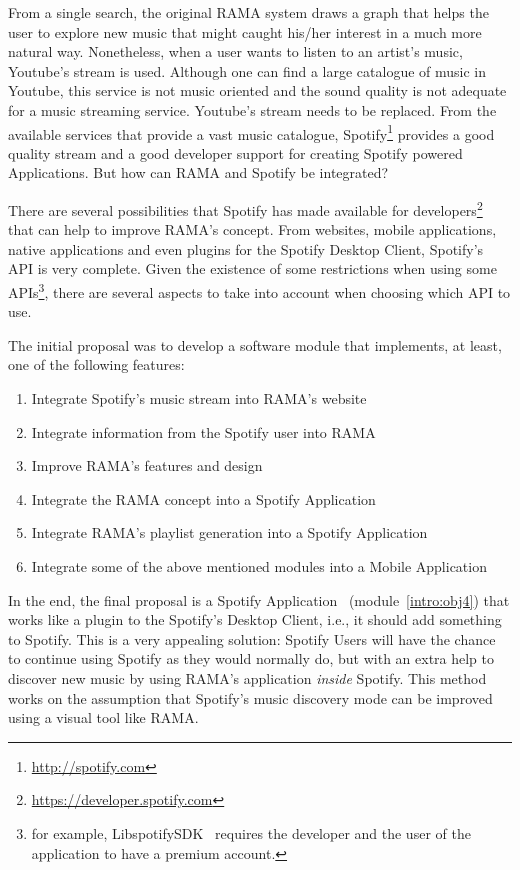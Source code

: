 \documentclass[twocolumn]{article}
\begin{document}
  From a single search, the original RAMA system draws a graph that helps the user to explore new music that might caught his/her interest in a much more natural way.
  Nonetheless, when a user wants to listen to an artist's music, Youtube's stream is used.
  Although one can find a large catalogue of music in Youtube, this service is not music oriented and the sound quality is not adequate for a music streaming service.
  Youtube's stream needs to be replaced.
  From the available services that provide a vast music catalogue, Spotify\footnote{\url{http://spotify.com}} provides a good quality stream and a good developer support for creating Spotify powered Applications.
  But how can RAMA and Spotify be integrated?
  
  There are several possibilities that Spotify has made available for developers\footnote{\url{https://developer.spotify.com}} that can help to improve RAMA's concept.
  From websites, mobile applications, native applications and even plugins for the Spotify Desktop Client, Spotify's API is very complete.
  Given the existence of some restrictions when using some APIs\footnote{for example, LibspotifySDK~\cite{libspotifysdk} requires the developer and the user of the application to have a premium account.}, there are several aspects to take into account when choosing which API to use.

  The initial proposal was to develop a software module that implements, at least, one of the following features:

  \begin{enumerate}
    \item \label{intro:obj1} Integrate Spotify's music stream into RAMA's website
    \item \label{intro:obj2} Integrate information from the Spotify user into RAMA
    \item \label{intro:obj3} Improve RAMA's features and design
    \item \label{intro:obj4} Integrate the RAMA concept into a Spotify Application
    \item \label{intro:obj5} Integrate RAMA's playlist generation into a Spotify Application
    \item \label{intro:obj6} Integrate some of the above mentioned modules into a Mobile Application
  \end{enumerate}

  In the end, the final proposal is a Spotify Application~\cite{spotifyapps} (module~\ref{intro:obj4}) that works like a plugin to the Spotify's Desktop Client, i.e., it should add something to Spotify.
  This is a very appealing solution: Spotify Users will have the chance to continue using Spotify as they would normally do, but with an extra help to discover new music by using RAMA's application \emph{inside} Spotify. 
  This method works on the assumption that Spotify's music discovery mode can be improved using a visual tool like RAMA.
\end{document}
